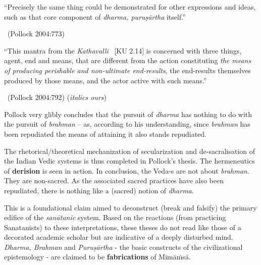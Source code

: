 \begin{myquote}
“Precisely the same thing could be demonstrated for other expressions and ideas, such as that core component of \textit{dharma, puruṣārtha} itself.”

~\hfill (Pollock 2004:773)
\end{myquote}

\begin{myquote}
“This mantra from the \textit{Kathavalli}  [KU 2.14] is concerned with three things, agent, end and means, that are different from the action constituting \textit{the means of producing perishable and non-ultimate end-results}, the end-results themselves produced by those means, and the actor active with such means.”

\vskip -5pt

~\hfill (Pollock 2004:792) (\textit{italics ours})
\end{myquote}

Pollock very glibly concludes that the pursuit of \textit{dharma} has nothing to do with the pursuit of \textit{brahman} – as, according to his understanding, since \textit{brahman} has been repudiated the means of attaining it also stands repudiated.

The rhetorical/theoretical mechanization of secularization and de-sacralisation of the Indian Vedic systems is thus completed in Pollock’s thesis. The hermeneutics of \textbf{derision} is seen in action. In conclusion, the Veda-s are not about \textit{brahman}. They are non-sacred. As the associated sacred practices have also been repudiated, there is nothing like a (sacred) notion of \textit{dharma}.

This is a foundational claim aimed to deconstruct (break and falsify) the primary edifice of the \textit{sanātanic} system. Based on the reactions (from practicing Sanatanists) to these interpretations, these theses do not read like those of a decorated academic scholar but are indicative of a deeply disturbed mind. \textit{Dharma, Brahman} and \textit{Puruṣārtha} - the basic constructs of the civilizational epistemology - are claimed to be \textbf{fabrications} of Mīmāṁsā.


